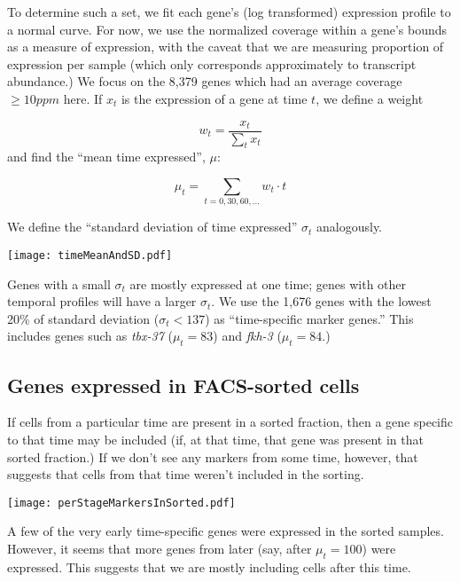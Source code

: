 \documentclass{article}
\begin{document}
To determine such a set, we fit each gene's (log transformed) expression
profile to a normal curve.
For now, we use the normalized coverage within a gene's bounds as a measure
of expression, with the caveat that we are measuring proportion of expression per
sample (which only corresponds approximately to transcript abundance.)
We focus on the 8,379 genes which had an average coverage $\ge 10 ppm$ here.
If $x_t$ is the expression of a gene at time $t$,
we define a weight

\[
w_t = \frac{x_t}{\sum_t x_t}
\]
and find the ``mean time expressed'', $\mu$:

\[
\mu_t = \sum_{t = 0,30,60,...} w_t \cdot t
\]

We define the ``standard deviation of time expressed'' $\sigma_t$ analogously.


\begin{center}
\texttt{[image: timeMeanAndSD.pdf]}
\end{center}

Genes with a small $\sigma_t$ are mostly expressed at one time; genes with
other temporal profiles will have a larger $\sigma_t$. We use the 1,676
genes with the lowest 20\% of standard deviation ($\sigma_t < 137$)
as ``time-specific marker genes.''
This includes genes such as {\em tbx-37} ($\mu_t = 83$) and {\em fkh-3}
($\mu_t = 84$.)

\subsection*{Genes expressed in FACS-sorted cells}

If cells from a particular time are present in a sorted fraction, then a
gene specific to that time may be included (if, at that time, that gene was present in
that sorted fraction.)
If we don't see any markers from some time, however,
that suggests that cells from that time weren't included in the sorting.

\texttt{[image: perStageMarkersInSorted.pdf]}

A few of the very early time-specific genes were expressed in the sorted samples.
However, it seems that more genes from later (say, after $\mu_t = 100$)
were expressed. This suggests that we are mostly including cells after this time.
\end{document}
